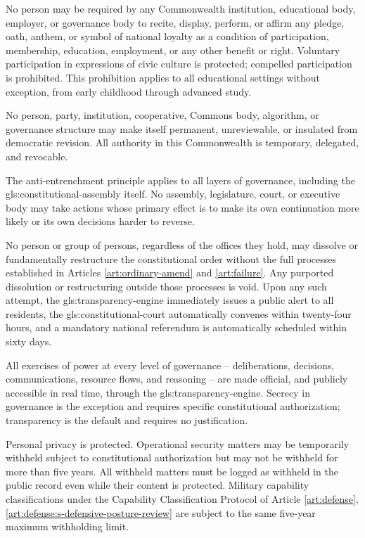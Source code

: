No person may be required by any Commonwealth institution, educational body, employer, or governance body to recite, display, perform, or affirm any pledge, oath, anthem, or symbol of national loyalty as a condition of participation, membership, education, employment, or any other benefit or right. Voluntary participation in expressions of civic culture is protected; compelled participation is prohibited. This prohibition applies to all educational settings without exception, from early childhood through advanced study.


No person, party, institution, cooperative, Commons body, algorithm, or governance structure may make itself permanent, unreviewable, or insulated from democratic revision. All authority in this Commonwealth is temporary, delegated, and revocable.

The anti-entrenchment principle applies to all layers of governance, including the \gls{gls:constitutional-assembly} itself. No assembly, legislature, court, or executive body may take actions whose primary effect is to make its own continuation more likely or its own decisions harder to reverse.

No person or group of persons, regardless of the offices they hold, may dissolve or fundamentally restructure the constitutional order without the full processes established in Articles \ref{art:ordinary-amend} and \ref{art:failure}. Any purported dissolution or restructuring outside those processes is void. Upon any such attempt, the \gls{gls:transparency-engine} immediately issues a public alert to all residents, the \gls{gls:constitutional-court} automatically convenes within twenty-four hours, and a mandatory national referendum is automatically scheduled within sixty days.


All exercises of power at every level of governance -- deliberations, decisions, communications, resource flows, and reasoning -- are made official, and publicly accessible in real time, through the \gls{gls:transparency-engine}. Secrecy in governance is the exception and requires specific constitutional authorization; transparency is the default and requires no justification.

Personal privacy is protected. Operational security matters may be temporarily withheld subject to constitutional authorization but may not be withheld for more than five years. All withheld matters must be logged as withheld in the public record even while their content is protected. Military capability classifications under the Capability Classification Protocol of Article \ref{art:defense}, \ref{art:defense:s-defensive-posture-review} are subject to the same five-year maximum withholding limit.